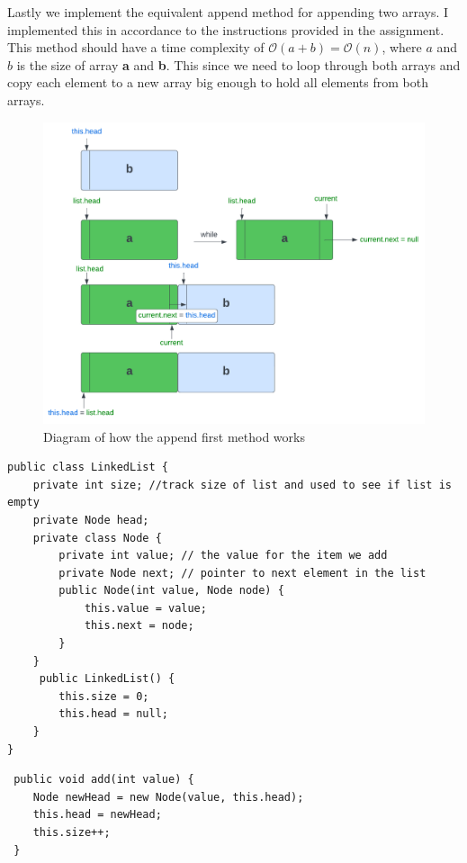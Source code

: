 \documentclass[a4paper,11pt]{article}
\newenvironment{code}{\captionsetup{type=listing}}{}
\begin{document}
Lastly we implement the equivalent append method for appending two arrays. I implemented this in accordance to the instructions provided
in the assignment. This method should have a time complexity of $\mathcal{O}(a+b)=\mathcal{O}(n)$, where $a$ and $b$ is the size of array
\textbf{a} and \textbf{b}. This since we need to loop through both arrays and copy each element to a new array big enough to hold
all elements from both arrays.

\begin{figure}[h]
    \centering
    \includegraphics[width=.8\textwidth]{appendDiagram.pdf}
    \caption{Diagram of how the append first method works}
    \label{fig:append}
\end{figure}

\begin{code}
    \label{code:classStructure}
    \begin{verbatim}
public class LinkedList {
    private int size; //track size of list and used to see if list is empty
    private Node head;
    private class Node {
        private int value; // the value for the item we add
        private Node next; // pointer to next element in the list
        public Node(int value, Node node) {
            this.value = value;
            this.next = node;
        }
    }
     public LinkedList() {
        this.size = 0;
        this.head = null;
    }
}
\end{verbatim}
\end{code}
\newpage
\begin{code}
    \label{code:add}
    \begin{verbatim}
 public void add(int value) {
    Node newHead = new Node(value, this.head);
    this.head = newHead;
    this.size++;
 }
\end{verbatim}
\end{code}
\end{document}
